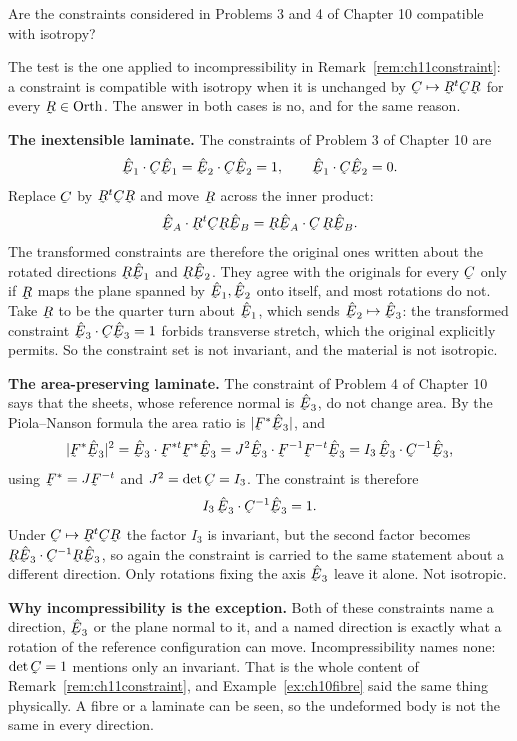\begin{problem}
Are the constraints considered in Problems 3 and 4 of Chapter 10
compatible with isotropy?
\end{problem}

\begin{solution}
The test is the one applied to incompressibility in
Remark~\ref{rem:ch11constraint}: a constraint is compatible with
isotropy when it is unchanged by $\bC\mapsto\bR^{t}\bC\bR$ for every
$\bR\in\Orth$. The answer in both cases is no, and for the same reason.

\textbf{The inextensible laminate.} The constraints of Problem 3 of
Chapter 10 are
\[
   \ip{\hbE_{1}}{\bC\hbE_{1}}=\ip{\hbE_{2}}{\bC\hbE_{2}}=1,
   \qquad \ip{\hbE_{1}}{\bC\hbE_{2}}=0 .
\]
Replace $\bC$ by $\bR^{t}\bC\bR$ and move $\bR$ across the inner
product:
\[
   \ip{\hbE_{A}}{\bR^{t}\bC\bR\hbE_{B}}
   =\ip{\bR\hbE_{A}}{\bC\,\bR\hbE_{B}} .
\]
The transformed constraints are therefore the original ones written
about the rotated directions $\bR\hbE_{1}$ and $\bR\hbE_{2}$. They agree
with the originals for every $\bC$ only if $\bR$ maps the plane spanned
by $\hbE_{1},\hbE_{2}$ onto itself, and most rotations do not. Take
$\bR$ to be the quarter turn about $\hbE_{1}$, which sends
$\hbE_{2}\mapsto\hbE_{3}$: the transformed constraint
$\ip{\hbE_{3}}{\bC\hbE_{3}}=1$ forbids transverse stretch, which the
original explicitly permits. So the constraint set is not invariant, and
the material is not isotropic.

\textbf{The area-preserving laminate.} The constraint of Problem 4 of
Chapter 10 says that the sheets, whose reference normal is $\hbE_{3}$,
do not change area. By the Piola--Nanson formula  the area
ratio is $|\bF^{*}\hbE_{3}|$, and
\[
   |\bF^{*}\hbE_{3}|^{2}=\ip{\hbE_{3}}{\bF^{*t}\bF^{*}\hbE_{3}}
   =J^{2}\ip{\hbE_{3}}{\bF^{-1}\bF^{-t}\hbE_{3}}
   =I_{3}\,\ip{\hbE_{3}}{\bC^{-1}\hbE_{3}},
\]
using $\bF^{*}=J\bF^{-t}$ and $J^{2}=\det\bC=I_{3}$. The constraint is
therefore
\[
   I_{3}\,\ip{\hbE_{3}}{\bC^{-1}\hbE_{3}}=1 .
\]
Under $\bC\mapsto\bR^{t}\bC\bR$ the factor $I_{3}$ is invariant, but the
second factor becomes $\ip{\bR\hbE_{3}}{\bC^{-1}\bR\hbE_{3}}$, so again
the constraint is carried to the same statement about a different
direction. Only rotations fixing the axis $\hbE_{3}$ leave it alone.
Not isotropic.

\textbf{Why incompressibility is the exception.} Both of these
constraints name a direction, $\hbE_{3}$ or the plane normal to it, and
a named direction is exactly what a rotation of the reference
configuration can move. Incompressibility names none: $\det\bC=1$
mentions only an invariant. That is the whole content of
Remark~\ref{rem:ch11constraint}, and Example~\ref{ex:ch10fibre} said the
same thing physically. A fibre or a laminate can be seen, so the
undeformed body is not the same in every direction.
\end{solution}

